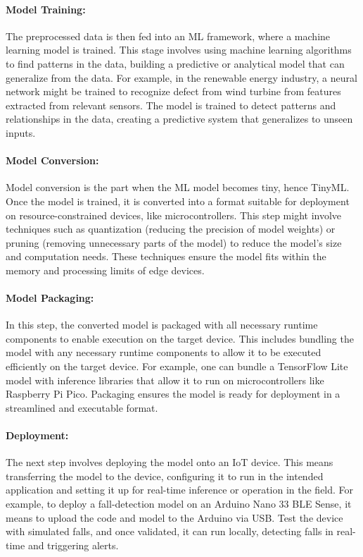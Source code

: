 \documentclass[twocolumn]{article}
\begin{document}
\paragraph{Model Training:}
	The preprocessed data is then fed into an ML framework, where a machine learning model is trained. This stage involves using machine learning algorithms to find patterns in the data, building a predictive or analytical model that can generalize from the data. For example, in the renewable energy industry, a neural network might be trained to recognize defect from wind turbine from features extracted from relevant sensors. The model is trained to detect patterns and relationships in the data, creating a predictive system that generalizes to unseen inputs. \\[0.10cm]

\paragraph{Model Conversion:}
	Model conversion is the part when the ML model becomes tiny, hence TinyML. Once the model is trained, it is converted into a format suitable for deployment on resource-constrained devices, like microcontrollers. This step might involve techniques such as quantization (reducing the precision of model weights) or pruning (removing unnecessary parts of the model) to reduce the model’s size and computation needs. These techniques ensure the model fits within the memory and processing limits of edge devices.
	\\[0.10cm]

\paragraph{Model Packaging:}
	In this step, the converted model is packaged with all necessary runtime components to enable execution on the target device. This includes bundling the model with any necessary runtime components to allow it to be executed efficiently on the target device. For example, one can bundle a TensorFlow Lite model with inference libraries that allow it to run on microcontrollers like Raspberry Pi Pico. Packaging ensures the model is ready for deployment in a streamlined and executable format.
	\\[0.10cm]

\paragraph{Deployment:}
	The next step involves deploying the model onto an IoT device. This means transferring the model to the device, configuring it to run in the intended application and setting it up for real-time inference or operation in the field. For example, to deploy a fall-detection model on an Arduino Nano 33 BLE Sense, it means to upload the code and model to the Arduino via USB. Test the device with simulated falls, and once validated, it can run locally, detecting falls in real-time and triggering alerts.\\[0.10cm]
\end{document}

